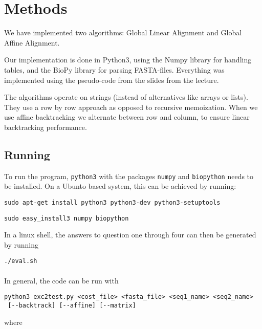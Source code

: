 \section{Methods}

We have implemented two algorithms: Global Linear Alignment and Global Affine Alignment. 

Our implementation is done in Python3, using the Numpy library for handling tables, and the BioPy library for parsing FASTA-files.
Everything was implemented using the pseudo-code from the slides from the lecture. 

The algorithms operate on strings (instead of alternatives like arrays or lists). They use a row by row approach as opposed to recursive memoization. 
When we use affine backtracking we alternate between row and column, to ensure linear backtracking performance. 

\subsection{Running}

To run the program, \verb|python3| with the packages \verb|numpy| and
\verb|biopython| needs to be installed. On a Ubunto based system, this can
be achieved by running:

\verb|sudo apt-get install python3 python3-dev python3-setuptools|

\verb|sudo easy_install3 numpy biopython|

In a linux shell, the answers to question one through four can then be
generated by running

\verb|./eval.sh|

\paragraph{}
In general, the code can be run with

\begin{verbatim}
python3 exc2test.py <cost_file> <fasta_file> <seq1_name> <seq2_name>
 [--backtrack] [--affine] [--matrix]
\end{verbatim}

where

